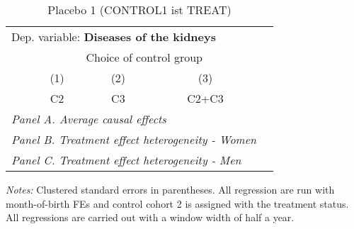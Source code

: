  \begin{table}[H] \centering \begin{threeparttable} \caption{Placebo 1 (CONTROL1 ist TREAT) } {\def\sym#1{\ifmmode^{#1}\else\(^{#1}\)\fi} \begin{tabular}{l*{4}{c}} \toprule \multicolumn{4}{l}{Dep. variable: \textbf{Diseases of the kidneys}} \\ & \multicolumn{3}{c}{Choice of control group} \\ \cmidrule(lr){2-4}
            &\multicolumn{1}{c}{(1)}&\multicolumn{1}{c}{(2)}&\multicolumn{1}{c}{(3)}\\
            &\multicolumn{1}{c}{C2}&\multicolumn{1}{c}{C3}&\multicolumn{1}{c}{C2+C3}\\
\midrule
 \multicolumn{4}{l}{\emph{Panel A. Average causal effects}} \\      \midrule\multicolumn{4}{l}{\emph{Panel B. Treatment effect heterogeneity - Women}} \\      \midrule\multicolumn{4}{l}{\emph{Panel C. Treatment effect heterogeneity - Men}} \\      
\bottomrule \end{tabular} } \begin{tablenotes} \item \scriptsize \emph{Notes:} Clustered standard errors in parentheses. All regression are run with month-of-birth FEs and control cohort 2 is assigned with the treatment status. All regressions are carried out with a window width of half a year. \end{tablenotes} \end{threeparttable} \end{table} 
